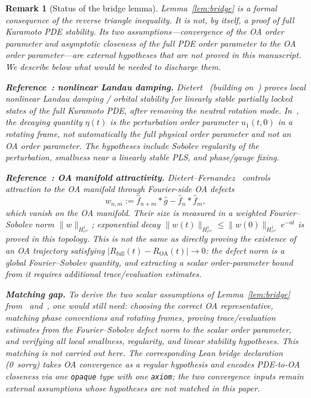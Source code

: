 \documentclass[11pt,a4paper]{article}
\newtheorem{remark}[theorem]{Remark}
\theoremstyle{definition}
\begin{document}
\begin{remark}[Status of the bridge lemma]\label{rem:bridge-hypotheses}
Lemma~\ref{lem:bridge} is a formal consequence of the reverse triangle inequality. It is not, by itself, a proof of full Kuramoto PDE stability. Its two assumptions---convergence of the OA order parameter and asymptotic closeness of the full PDE order parameter to the OA order parameter---are \emph{external hypotheses that are not proved in this manuscript}. We describe below what would be needed to discharge them.

\medskip\noindent\textbf{Reference~\cite{dietert2017}: nonlinear Landau damping.} Dietert~\cite{dietert2017} (building on~\cite{dietert-thesis}) proves local nonlinear Landau damping / orbital stability for linearly stable partially locked states of the full Kuramoto PDE, after removing the neutral rotation mode. In~\cite{dietert2017}, the decaying quantity $\eta(t)$ is the perturbation order parameter $u_1(t,0)$ in a rotating frame, not automatically the full physical order parameter and not an OA order parameter. The hypotheses include Sobolev regularity of the perturbation, smallness near a linearly stable PLS, and phase/gauge fixing.

\medskip\noindent\textbf{Reference~\cite{dietert-fernandez2018}: OA manifold attractivity.} Dietert--Fernandez~\cite{dietert-fernandez2018} controls attraction to the OA manifold through Fourier-side OA defects
\[
w_{n,m} := \hat f_{n+m} * \hat g - \hat f_n * \hat f_m,
\]
which vanish on the OA manifold. Their size is measured in a weighted Fourier--Sobolev norm $\|w\|_{H^1_{e^{a\tau}}}$; exponential decay $\|w(t)\|_{H^1_{e^{a\tau}}} \leq \|w(0)\|_{H^1_{e^{a\tau}}}\,e^{-at}$ is proved in this topology. This is not the same as directly proving the existence of an OA trajectory satisfying $|R_{\mathrm{full}}(t) - R_{\mathrm{OA}}(t)| \to 0$: the defect norm is a global Fourier--Sobolev quantity, and extracting a scalar order-parameter bound from it requires additional trace/evaluation estimates.

\medskip\noindent\textbf{Matching gap.} To derive the two scalar assumptions of Lemma~\ref{lem:bridge} from~\cite{dietert2017} and~\cite{dietert-fernandez2018}, one would still need: choosing the correct OA representative, matching phase conventions and rotating frames, proving trace/evaluation estimates from the Fourier--Sobolev defect norm to the scalar order parameter, and verifying all local smallness, regularity, and linear stability hypotheses. This matching is not carried out here. The corresponding Lean bridge declaration (0~sorry) takes OA convergence as a regular hypothesis and encodes PDE-to-OA closeness via one \texttt{opaque} type with one \texttt{axiom}; the two convergence inputs remain external assumptions whose hypotheses are not matched in this paper.
\end{remark}
\end{document}

